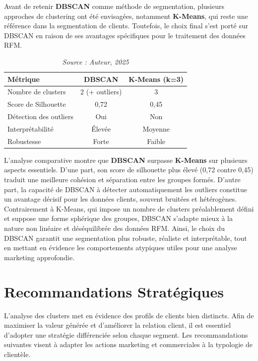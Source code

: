 \documentclass[a4paper,12pt]{article}
\begin{document}
Avant de retenir \textbf{DBSCAN} comme méthode de segmentation, plusieurs approches de clustering ont été envisagées, notamment \textbf{K-Means}, qui reste une référence dans la segmentation de clients. Toutefois, le choix final s'est porté sur DBSCAN en raison de ses avantages spécifiques pour le traitement des données RFM.

\begin{table}[H]
\centering
\begin{tabular}{|l|c|c|}
\hline
\textbf{Métrique} & \textbf{DBSCAN} & \textbf{K-Means (k=3)} \\
\hline
Nombre de clusters & 2 (+ outliers) & 3 \\
\hline
Score de Silhouette & 0,72 & 0,45 \\
\hline
Détection des outliers & Oui & Non \\
\hline
Interprétabilité & Élevée & Moyenne \\
\hline
Robustesse & Forte & Faible \\
\hline
\end{tabular}
\caption{Comparaison entre DBSCAN et K-Means}
\label{tab:clustering_comparison}
\caption*{\textit{Source : Auteur, 2025}}
\end{table}

L'analyse comparative montre que \textbf{DBSCAN} surpasse \textbf{K-Means} sur plusieurs aspects essentiels. D'une part, son score de silhouette plus élevé (0,72 contre 0,45) traduit une meilleure cohésion et séparation entre les groupes formés. D'autre part, la capacité de DBSCAN à détecter automatiquement les outliers constitue un avantage décisif pour les données clients, souvent bruitées et hétérogènes. Contrairement à K-Means, qui impose un nombre de clusters préalablement défini et suppose une forme sphérique des groupes, DBSCAN s'adapte mieux à la nature non linéaire et déséquilibrée des données RFM. Ainsi, le choix du DBSCAN garantit une segmentation plus robuste, réaliste et interprétable, tout en mettant en évidence les comportements atypiques utiles pour une analyse marketing approfondie.

\section{Recommandations Stratégiques}

L'analyse des clusters met en évidence des profils de clients bien distincts. Afin de maximiser la valeur générée et d'améliorer la relation client, il est essentiel d'adopter une stratégie différenciée selon chaque segment. Les recommandations suivantes visent à adapter les actions marketing et commerciales à la typologie de clientèle.
\end{document}
